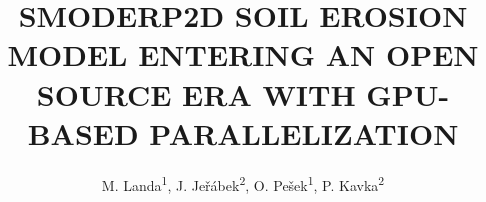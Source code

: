 \documentclass{isprs} %
\begin{document}
\title{SMODERP2D SOIL EROSION MODEL ENTERING AN OPEN SOURCE ERA WITH
  GPU-BASED PARALLELIZATION}

\author{
 M. Landa\textsuperscript{1}, J. Je\v{r}\'{a}bek\textsuperscript{2}, O. Pe\v{s}ek\textsuperscript{1}, P. Kavka\textsuperscript{2}}

\address{
  \textsuperscript{1 }Dept.\ of Geomatics, Faculty of Civil Engineering, Czech Technical University in Prague,\\ Czech Republic - (martin.landa, ondrej.pesek)@fsv.cvut.cz\\
  \textsuperscript{2 }Dept.\ of Landscape Water Conservation, Faculty of Civil Engineering, Czech Technical University in Prague,\\ Czech Republic - (jakub.jerabek, petr.kavka)@fsv.cvut.cz\\
}



\icwg{}   %
\end{document}
